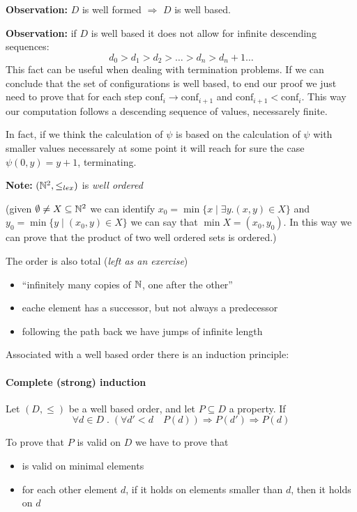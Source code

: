 \textbf{Observation:} $D$ is well formed $\Rightarrow$ $D$ is well
based.

\textbf{Observation:} if $D$ is well based it does not allow for
infinite descending sequences:
\[
  d_0 > d_1 > d_2 > \dots > d_n > d_n+1 \dots
\]
\newcommand{\conf}{\text{conf}} This fact can be useful when dealing
with termination problems. If we can conclude that the set of
configurations is well based, to end our proof we just need to prove
that for each step \( \conf _i \rightarrow \conf_{i+1} \) and
\( \conf _{i+1} < \conf _i \). This way our computation follows a descending sequence of values, necessarely finite.

In fact, if we think the calculation of $\psi$ is based on the
calculation of $\psi$ with smaller values necessarely at some point it
will reach for sure the case $\psi(0,y) = y + 1$, terminating.

\textbf{Note:} $(\mathbb{N}^2, \leq_{lex})$ is \emph{well ordered}

(given $\emptyset \neq X \subseteq \mathbb{N}^2$ we can identify
$x_0 = \min\{x \; | \; \exists y.(x,y) \in X\}$ and
$y_0 = \min \{ y \; | \; (x_0,y) \in X\}$ we can say that
$\min X = (x_0, y_0)$. In this way we can prove that the product of
two well ordered sets is ordered.)

The order is also total (\emph{left as an exercise})
\begin{itemize}
\item ``infinitely many copies of $\mathbb{N}$, one after the other''
\item eache element has a successor, but not always a predecessor
\item following the path back we have jumps of infinite length
\end{itemize}

Associated with a well based order there is an induction principle:

\paragraph{\textbf{Complete (strong) induction}}

Let $(D, \leq)$ be a well based order, and let $P \subseteq D$ a
property. If
\[
  \forall d \in D \; . \; (\forall d' < d \quad P(d)) \Rightarrow P(d') \Rightarrow P(d)
\]

To prove that $P$ is valid on $D$ we have to prove that
\begin{itemize}
\item is valid on minimal elements
\item for each other element $d$, if it holds on elements smaller than
  $d$, then it holds on $d$
\end{itemize}


